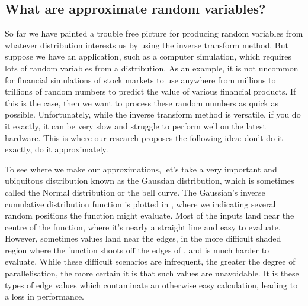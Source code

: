 \documentclass[11pt,a4paper,twoside,english]{extarticle}
\begin{document}
\subsection{What are approximate random variables?}
\label{sec:what_are_approximate_random_variables}

So far we have painted a trouble free picture for producing random variables from whatever distribution interests us by using the inverse transform method. But suppose we have an application, such as a computer simulation, which requires lots of random variables from a distribution. As an example, it is not uncommon for financial simulations of stock markets to use anywhere from millions to trillions of random numbers to predict the value of various financial products. If this is the case, then we want to process these random numbers as quick as possible. Unfortunately, while the inverse transform method is versatile, if you do it exactly, it can be very slow and struggle to perform well on the latest hardware. This is where our research proposes the following idea: don't do it exactly, do it approximately. 

To see where we make our approximations, let's take a very important and ubiquitous distribution known as the Gaussian distribution, which is sometimes called the Normal distribution or the bell curve. The Gaussian's inverse cumulative distribution function is plotted in ,
where we indicating several random positions the function might evaluate. Most of the inputs land near the centre of the function, where it's nearly a straight line and easy to evaluate. However, sometimes values land near the edges, in the more difficult shaded region where the function shoots off the edges of , and is much harder to evaluate. While these difficult scenarios are infrequent, the greater the degree of parallelisation, the more certain it is that such values are unavoidable. It is these types of edge values which contaminate an otherwise easy calculation, leading to a loss in performance. 
\end{document}
